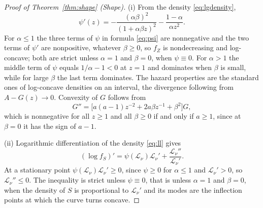\documentclass[10pt,a4paper]{amsart}
\providecommand{\Leh}{\mathscr{L}}
\begin{document}
		\begin{proof}[Proof of Theorem~\ref{thm:shape} (Shape)]\leavevmode
			
			\noindent(i) From the density \eqref{eq:lgdensity},
			\begin{equation}\label{eq:psiprime}
				\psi'(z)=-\frac{(\alpha\beta)^{2}}{(1+\alpha\beta z)^{2}}-\frac{1-\alpha}{\alpha z^{2}} .
			\end{equation}
			For $\alpha\le1$ the three terms of $\psi$ in formula \eqref{eq:psi}
			are nonnegative and the two terms of $\psi'$ are nonpositive,
			whatever $\beta\ge0$, so $f_Z$ is nondecreasing and log-concave;
			both are strict unless $\alpha=1$ and $\beta=0$, when $\psi\equiv0$.
			For $\alpha>1$ the middle term of $\psi$ equals $1/\alpha-1<0$ at
			$z=1$ and dominates when $\beta$ is small, while for large $\beta$
			the last term dominates. The hazard properties
			are the standard ones of log-concave densities on an interval, the
			divergence following from $A-G(z)\to0$. Convexity of $G$ follows
			from
			\begin{equation}\label{eq:Gsecond}
				G''=\bigl[a(a-1)z^{-2}+2a\beta z^{-1}+\beta^{2}\bigr]G,
			\end{equation}
			which is nonnegative for all $z\ge1$ and all $\beta\ge0$ if and only
			if $a\ge1$, since at $\beta=0$ it has the sign of $a-1$.
			
			\noindent(ii)
			Logarithmic differentiation of the density \eqref{eq:ll} gives
			\begin{equation}\label{eq:logfS}
				(\log f_S)'=\psi(\Leh_\nu)\Leh_\nu'+\frac{\Leh_\nu''}{\Leh_\nu'} .
			\end{equation}
			At a stationary point $\psi(\Leh_\nu)\Leh_\nu'\ge0$, since
			$\psi\ge0$ for $\alpha\le1$ and $\Leh_\nu'>0$, so $\Leh_\nu''\le0$.
			The inequality is strict unless $\psi\equiv0$, that is unless
			$\alpha=1$ and $\beta=0$, when the density of $S$ is proportional
			to $\Leh_\nu'$ and its modes are the inflection points at which
			the curve turns concave.
			

\end{proof}
\end{document}
